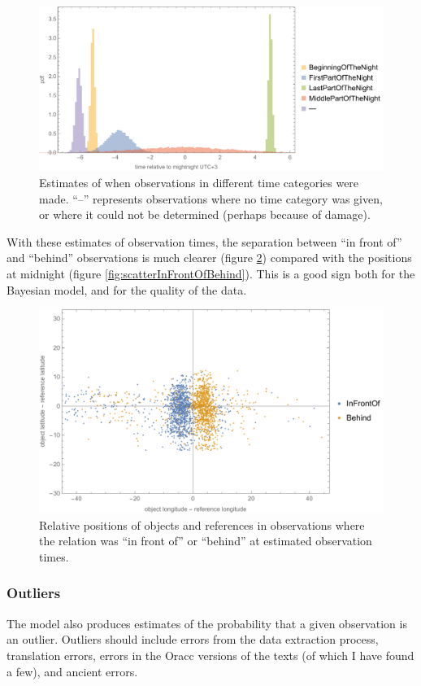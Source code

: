 \documentclass{article}
\begin{document}
\begin{figure}[h]
    \centering
    \includegraphics[width=0.75\linewidth]{timeEstimates.pdf}
    \caption{Estimates of when observations in different time categories were made. ``--'' represents observations where no time category was given, or where it could not be determined (perhaps because of damage).}
    \label{fig:timeEstimates}
\end{figure}

With these estimates of observation times, the separation between ``in front of'' and ``behind'' observations is much clearer (figure \ref{fig:scatterInFrontOfBehindTimeAdjusted}) compared with the positions at midnight (figure \ref{fig:scatterInFrontOfBehind}). This is a good sign both for the Bayesian model, and for the quality of the data.

\begin{figure}[h]
    \centering
    \includegraphics[width=0.7\linewidth]{infrontofBehindScatterTimeAdjusted.pdf}
    \caption{Relative positions of objects and references in observations where the relation was ``in front of'' or ``behind'' at estimated observation times.}
    \label{fig:scatterInFrontOfBehindTimeAdjusted}
\end{figure}

\subsubsection{Outliers}
The model also produces estimates of the probability that a given observation is an outlier. Outliers should include errors from the data extraction process, translation errors, errors in the Oracc versions of the texts (of which I have found a few), and ancient errors.
\end{document}
